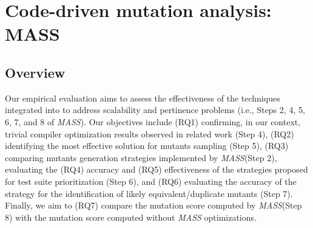 

\section{Code-driven mutation analysis: MASS}

\subsection{Overview}
\label{sec:evaluation}

\renewcommand{\APPR}{\textit{MASS}\xspace}

\STARTCHANGEDNOV

Our empirical evaluation aims to assess the effectiveness of the techniques integrated into \INDEX{\APPR} to address scalability and pertinence problems (i.e., Steps 2, 4, 5, 6, 7, and 8 of \APPR). Our objectives include (RQ1) confirming, in our context, trivial compiler optimization results observed in related work (Step 4), (RQ2) identifying the most effective solution for mutants sampling (Step 5), (RQ3) comparing mutants generation strategies implemented by \APPR (Step 2), evaluating the (RQ4) accuracy and (RQ5) effectiveness of the strategies proposed  for test suite prioritization (Step 6), and (RQ6) evaluating the accuracy of the strategy for the identification of likely equivalent/duplicate mutants (Step 7). Finally, we aim to (RQ7) compare the mutation score computed by \APPR (Step 8) with the mutation score computed without \APPR optimizations.


